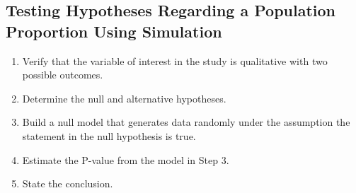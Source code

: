 \documentclass{report}
\begin{document}
    \bigbreak \noindent \bigbreak \noindent 
    \subsection*{Testing Hypotheses Regarding a Population Proportion Using Simulation}
    \bigbreak \noindent 
        \begin{enumerate}
        \item Verify that the variable of interest in the study is qualitative with two possible outcomes.
        \item Determine the null and alternative hypotheses. 
        \item Build a null model that generates data randomly under the assumption the statement in the null hypothesis is true.
        \item Estimate the P-value from the model in Step 3.
        \item State the conclusion.
    \end{enumerate}

    \pagebreak 
\end{document}
